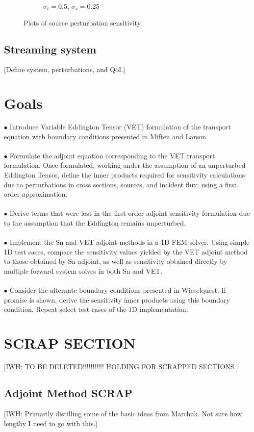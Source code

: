 \documentclass{article}
\newcommand{\sigt}{\sigma_t}
\newcommand{\sigs}{\sigma_s}
\begin{document}
\begin{figure}[H]
\begin{subfigure}{.5\textwidth}
  \caption{$\sigt=0.5$, $\sigs=0.25$}
  \label{fig:sfig3}
\end{subfigure}
\caption{Plots of source perturbation sensitivity.}
\label{fig:fig}
\end{figure}

\subsection{Streaming system}
[Define system,  perturbations, and QoI.]

\section{Goals}
$\bullet$ Introduce Variable Eddington Tensor (VET) formulation of the transport equation with boundary conditions presented in Miften and Larson.
\\ \\
$\bullet$ Formulate the adjoint equation corresponding to the VET transport formulation. Once formulated, working under the assumption of an unperturbed Eddington Tensor, define the inner products required for sensitivity calculations due to perturbations in cross sections, sources, and incident flux; using a first order approximation.
\\ \\
$\bullet$ Derive terms that were lost in the first order adjoint sensitivity formulation due to the assumption that the Eddington remains unperturbed. 
\\ \\
$\bullet$ Implement the Sn and VET adjoint methods in a 1D FEM solver. Using simple 1D test cases, compare the sensitivity values yielded by the VET adjoint method to those obtained by Sn adjoint, as well as sensitivity obtained directly by multiple forward system solves in both Sn and VET.
\\ \\
$\bullet$ Consider the alternate boundary conditions presented in Wieselquest. If promise is shown, derive the sensitivity inner products using this boundary condition. Repeat select test cases of the 1D implementation.

\newpage
\section{SCRAP SECTION}
{\color{red}[IWH: TO BE DELETED!!!!!!!!!!! HOLDING FOR SCRAPPED SECTIONS.]}
\subsection{Adjoint Method SCRAP}
{\color{red}[IWH: Primarily distilling some of the basic ideas from Marchuk. Not sure how lengthy I need to go with this.]}
\end{document}
